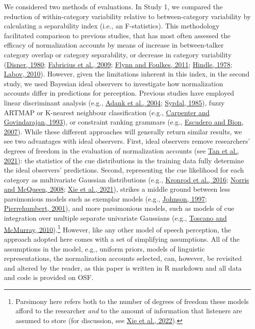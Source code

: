 \documentclass[utf8]{frontiersSCNS}
\begin{document}
We considered two methods of evaluations. In Study 1, we compared the reduction of within-category variability relative to between-category variability by calculating a separability index (i.e., an F-statistics). This methodology facilitated comparison to previous studies, that has most often assessed the efficacy of normalization accounts by means of increase in between-talker category overlap or category separability, or decrease in category variability (\protect\hyperlink{ref-disner1980}{Disner, 1980}; \protect\hyperlink{ref-fabricius2009}{Fabricius et al., 2009}; \protect\hyperlink{ref-Flynn2011}{Flynn and Foulkes, 2011}; \protect\hyperlink{ref-hindle1978}{Hindle, 1978}; \protect\hyperlink{ref-labov2010}{Labov, 2010}). However, given the limitations inherent in this index, in the second study, we used Bayesian ideal observers to investigate how normalization accounts differ in predictions for perception. Previous studies have employed linear discriminant analysis (e.g., \protect\hyperlink{ref-adank2004}{Adank et al., 2004}; \protect\hyperlink{ref-syrda1985}{Syrdal, 1985}), fuzzy ARTMAP or K-nearest neighbour classification (e.g., \protect\hyperlink{ref-carpenter1993}{Carpenter and Govindarajan, 1993}), or constraint ranking grammars (e.g., \protect\hyperlink{ref-escudero2007}{Escudero and Bion, 2007}). While these different approaches will generally return similar results, we see two advantages with ideal observers. First, ideal observers remove researchers' degrees of freedom in the evaluation of normalization accounts (see \protect\hyperlink{ref-tan2021}{Tan et al., 2021}): the statistics of the cue distributions in the training data fully determine the ideal observers' predictions. Second, representing the cue likelihood for each category as multivariate Gaussian distributions (e.g., \protect\hyperlink{ref-kronrod2016}{Kronrod et al., 2016}; \protect\hyperlink{ref-norris-mcqueen2008}{Norris and McQueen, 2008}; \protect\hyperlink{ref-xie2021cognition}{Xie et al., 2021}), strikes a middle ground between less parsimonious models such as exemplar models (e.g., \protect\hyperlink{ref-johnson1997}{Johnson, 1997}; \protect\hyperlink{ref-pierrehumbert2001}{Pierrehumbert, 2001}), and more parsimonious models, such as models of cue integration over multiple separate univariate Gaussians (e.g., \protect\hyperlink{ref-toscano-mcmurray2010}{Toscano and McMurray, 2010}).\footnote{Parsimony here refers both to the number of degrees of freedom these models afford to the researcher \emph{and} to the amount of information that listeners are assumed to store (for discussion, see \protect\hyperlink{ref-xie2022}{Xie et al., 2022}).} However, like any other model of speech perception, the approach adopted here comes with a set of simplifying assumptions. All of the assumptions in the model, e.g., uniform priors, models of linguistic representations, the normalization accounts selected, can, however, be revisited and altered by the reader, as this paper is written in R markdown and all data and code is provided on OSF.
\end{document}
